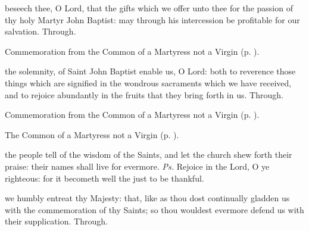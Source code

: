 
\secret
{} beseech thee, O Lord, that the gifts which we offer unto thee for the passion of thy holy Martyr John Baptist: may through his intercession be profitable for our salvation. Through.
\begin{rubric}
	 Commemoration  from the Common of a Martyress not a Virgin (p. \pageref{CommonMartyrNotVirgin}).
\end{rubric}


\postcommunion
{} the solemnity, of Saint John Baptist enable us, O Lord: both to reverence those things which are signified in the wondrous sacraments which we have received, and to rejoice abundantly in the fruits that they bring forth in us. Through.
\begin{rubric}
	 Commemoration  from the Common of a Martyress not a Virgin (p. \pageref{CommonMartyrNotVirgin}).
\end{rubric}


\clearpage
{}

\begin{rubric}
	The Common of a Martyress not a Virgin (p. \pageref{CommonMartyrNotVirgin}).
\end{rubric}


\vspace{-0.2\baselineskip}


\introit
{} the people tell of the wisdom of the Saints, and let the church shew forth their praise: their names shall live for evermore. \textit{Ps.} Rejoice in the Lord, O ye righteous: for it becometh well the just to be thankful.

\vspace{-0.25\baselineskip}

\collect

\vspace{-0.1\baselineskip}

 we humbly entreat thy Majesty: that, like as thou dost continually gladden us with the commemoration of thy Saints; so thou wouldest evermore defend us with their supplication. Through.

